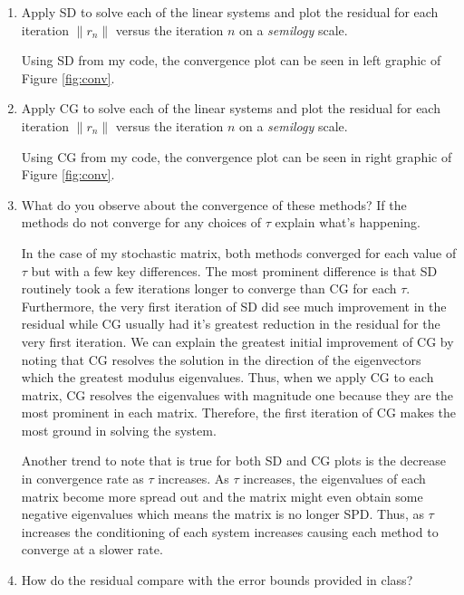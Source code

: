 \documentclass[a4paper,12pt]{article}
\newcommand{\norm}[1]{\lVert #1 \rVert}
\begin{document}
\begin{enumerate}[label = \arabic*)]
\begin{enumerate}[label = (\alph*)]
		\item Apply SD to solve each of the linear systems and plot the residual for each iteration $ \norm{r_n} $ versus the iteration $ n $ on a \emph{semilogy} scale. 
		
		Using SD from my code, the convergence plot can be seen in left graphic of Figure \ref{fig:conv}.
		
		\item Apply CG to solve each of the linear systems and plot the residual for each iteration $ \norm{r_n} $ versus the iteration $ n $ on a \emph{semilogy} scale.
		
		Using CG from my code, the convergence plot can be seen in right graphic of Figure \ref{fig:conv}.
		
		\item What do you observe about the convergence of these methods? If the methods do not converge for any choices of $ \tau $ explain what's happening.
		
		In the case of my stochastic matrix, both methods converged for each value of $ \tau $ but with a few key differences. The most prominent difference is that SD routinely took a few iterations longer to converge than CG for each $ \tau $. Furthermore, the very first iteration of SD did see much improvement in the residual while CG usually had it's greatest reduction in the residual for the very first iteration. We can explain the greatest initial improvement of CG by noting that CG resolves the solution in the direction of the eigenvectors which the greatest modulus eigenvalues. Thus, when we apply CG to each matrix, CG resolves the eigenvalues with magnitude one because they are the most prominent in each matrix. Therefore, the first iteration of CG makes the most ground in solving the system.
		
		Another trend to note that is true for both SD and CG plots is the decrease in convergence rate as $ \tau $ increases. As $ \tau $ increases, the eigenvalues of each matrix become more spread out and the matrix might even obtain some negative eigenvalues which means the matrix is no longer SPD. Thus, as $ \tau $ increases the conditioning of each system increases causing each method to converge at a slower rate.
		
		\item How do the residual compare with the error bounds provided in class?
		

\end{enumerate}
\end{enumerate}
\end{document}
